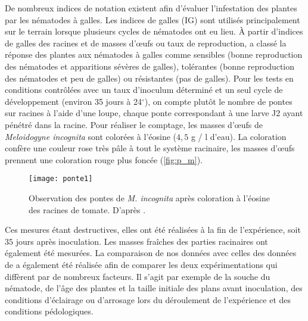 	 De nombreux indices de notation existent afin d’évaluer l'infestation des plantes par les nématodes à galles. Les indices de galles (IG) \citep{Zeck1971} sont utilisés principalement sur le terrain lorsque plusieurs cycles de nématodes ont eu lieu. À partir d'indices de  galles des racines et  de 
 masses d’œufs ou taux de reproduction, \citet{Canto-Saenz1985} a classé la réponse des plantes aux nématodes à galles
comme sensibles (bonne reproduction des nématodes et apparitions  sévères de galles), tolérantes (bonne reproduction des nématodes et peu de galles)  ou résistantes (pas de galles).
Pour les tests en conditions contrôlées avec un taux d’inoculum déterminé et un seul cycle de développement (environ 35 jours à 24$^\circ$),  on compte  plutôt le nombre de pontes sur racines à l'aide d'une loupe, chaque ponte correspondant à une larve J2 ayant pénétré dans la racine. Pour réaliser le comptage, les masses d’œufs de \textit{Meloidogyne incognita}   sont colorées à l'éosine ($4,5$ g / l d'eau). La coloration confère une couleur rose très pâle à tout le système racinaire, les masses d’œufs prennent une coloration rouge plus foncée (\autoref{fig:p_m}).
	\begin{figure}
	    \centering\texttt{[image: ponte1]} 
	   \caption[Observation des pontes  de \textit{M. incognita} après coloration à l'éosine des racines de tomate.]{Observation des pontes  de \textit{M. incognita} après coloration à l'éosine des racines de tomate. D'après \citet{Greco2010}.}
	   \label{fig:p_m}
	\end{figure}
	Ces mesures étant destructives, elles ont  été réalisées à la fin de l'expérience, soit $35$ jours après inoculation. Les masses fraîches des parties  racinaires ont également été mesurées. %
	La comparaison de nos données  avec celles des données de \citet{Ehwaeti1998} a  également été réalisée afin de comparer les deux expérimentations qui diffèrent par de nombreux facteurs. Il s'agit par exemple de la souche du nématode, de l'âge des plantes et la taille initiale des plans avant inoculation, des conditions d'éclairage ou d'arrosage lors du déroulement de l'expérience et des conditions pédologiques.
	
	
	
